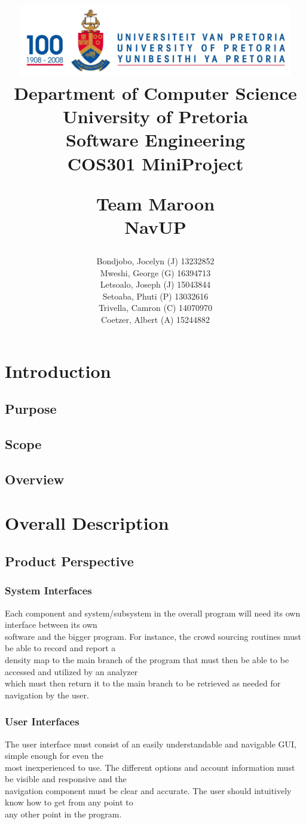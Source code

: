 \documentclass[a4paper,10pt]{article}
\title{\includegraphics[width=12cm]{Eeufeeslogo.jpg} \\
       Department of Computer Science \\
       University of Pretoria \\
       \vspace{0.5cm}
       Software Engineering\\
       COS301 MiniProject \\
       \vspace{0.5cm}
       \begin{large} \textbf{Team Maroon}\\ NavUP\end{large}}
\date{}
\author{Bondjobo, Jocelyn (J) 	13232852 		\\
		Mweshi, George (G)		16394713		\\
		Letsoalo, Joseph (J)	15043844		\\
		Setoaba, Phuti (P)		13032616		\\
		Trivella, Camron (C)	14070970		\\
		Coetzer, Albert (A)		15244882		\\
}
\begin{document}
\maketitle
\thispagestyle{empty}
\clearpage

\newpage
{}
\thispagestyle{empty}
\tableofcontents
\clearpage

\newpage


\section{Introduction}

	\subsection{Purpose} 	\subsection{Scope} 
	\subsection{Overview} 

\section{Overall Description}

	\subsection{Product Perspective}
	
		\subsubsection{System Interfaces}
			Each component and system/subsystem in the overall program will need its own interface between its own\\				software and the bigger program. For instance, the crowd sourcing routines must be able to record and report a\\			density map to the main branch of the program that must then be able to be accessed and utilized by an analyzer\\			which must then return it to the main branch to be retrieved as needed for navigation by the user.\\
		\subsubsection{User Interfaces}
			The user interface must consist of an easily understandable and navigable GUI, simple enough for even the\\				most inexperienced to use. The different options and account information must be visible and responsive and the\\			navigation component must be clear and accurate. The user should intuitively know how to get from any point to\\			any other point in the program.\\
\end{document}
